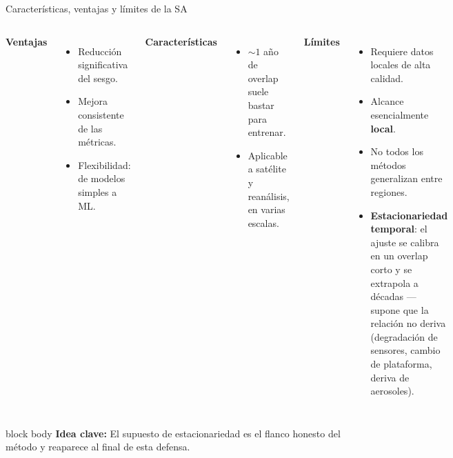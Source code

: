 \documentclass[aspectratio=169,11pt]{beamer}
\newcommand{\clave}[1]{%
  \begin{beamercolorbox}[wd=\linewidth,sep=6pt,rounded=true]{block body}%
    \footnotesize\textbf{\color{primary}Idea clave: }#1%
  \end{beamercolorbox}}
\begin{document}
\begin{frame}{Características, ventajas y límites de la SA}
  \scriptsize
  \begin{columns}[T]
    \textbf{\color{teal}Ventajas}
    \begin{itemize}
      \item Reducción significativa del sesgo.
      \item Mejora consistente de las métricas.
      \item Flexibilidad: de modelos simples a ML.
    \end{itemize}
    \textbf{\color{primary}Características}
    \begin{itemize}
      \item $\sim 1$ año de overlap suele bastar para entrenar.
      \item Aplicable a satélite y reanálisis, en varias escalas.
    \end{itemize}
    \textbf{\color{accent}Límites}
    \begin{itemize}
      \item Requiere datos locales de alta calidad.
      \item Alcance esencialmente \textbf{local}.
      \item No todos los métodos generalizan entre regiones.
      \item \textbf{Estacionariedad temporal}: el ajuste se calibra en un overlap corto y se extrapola a décadas — supone que la relación no deriva (degradación de sensores, cambio de plataforma, deriva de aerosoles).
    \end{itemize}
  \end{columns}
  \vspace{0.3em}
  \clave{El supuesto de estacionariedad es el flanco honesto del método y reaparece al final de esta defensa.}
\end{frame}
\end{document}
